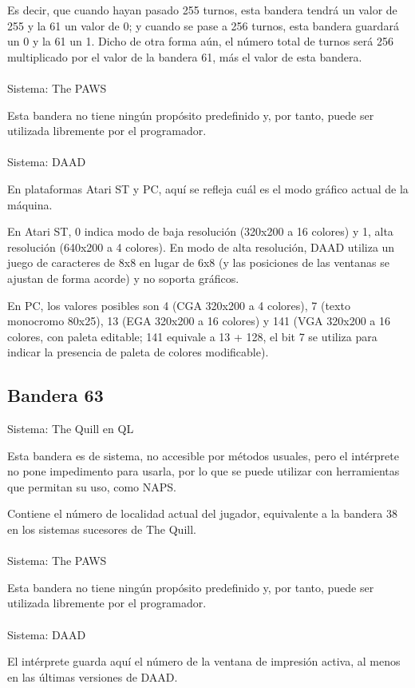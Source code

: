 \documentclass[11pt, a5paper]{article}
\newcommand{\quill}{\textsf{The Quill}\xspace}
\newcommand{\paw}{\textsf{The PAWS}\xspace}
\newcommand{\daad}{\textsf{DAAD}\xspace}
\newcommand{\sistema}[1]{\noindent Sistema: #1 \nopagebreak}
\begin{document}
Es decir, que cuando hayan pasado 255 turnos, esta bandera tendrá un valor de 255 y la 61 un valor de 0; y cuando se pase a 256 turnos, esta bandera guardará un 0 y la 61 un 1. Dicho de otra forma aún, el número total de turnos será 256 multiplicado por el valor de la bandera 61, más el valor de esta bandera.
\\\ \\
\sistema{\paw}

Esta bandera no tiene ningún propósito predefinido y, por tanto, puede ser utilizada libremente por el programador.
\\\ \\
\sistema{\daad}

En plataformas Atari ST y PC, aquí se refleja cuál es el modo gráfico actual de la máquina. \cite[pág. 62]{DAAD}

En Atari ST, 0 indica modo de baja resolución (320x200 a 16 colores) y 1, alta resolución (640x200 a 4 colores). En modo de alta resolución, \daad utiliza un juego de caracteres de 8x8 en lugar de 6x8 (y las posiciones de las ventanas se ajustan de forma acorde) y no soporta gráficos.

En PC, los valores posibles son 4 (CGA 320x200 a 4 colores), 7 (texto monocromo 80x25), 13 (EGA 320x200 a 16 colores) y 141 (VGA 320x200 a 16 colores, con paleta editable; 141 equivale a 13 + 128, el bit 7 se utiliza para indicar la presencia de paleta de colores modificable).

\subsection{Bandera 63}

\sistema{\quill en QL}

Esta bandera es de sistema, no accesible por métodos usuales, pero el intérprete no pone impedimento para usarla, por lo que se puede utilizar con herramientas que permitan su uso, como NAPS\cite{NAPS}.

Contiene el número de localidad actual del jugador, equivalente a la bandera 38 en los sistemas sucesores de \quill.
\\\ \\
\sistema{\paw}

Esta bandera no tiene ningún propósito predefinido y, por tanto, puede ser utilizada libremente por el programador.
\\\ \\
\sistema{\daad}

El intérprete guarda aquí el número de la ventana de impresión activa, al menos en las últimas versiones de \daad. \cite[pág. 62]{DAAD}
\end{document}
